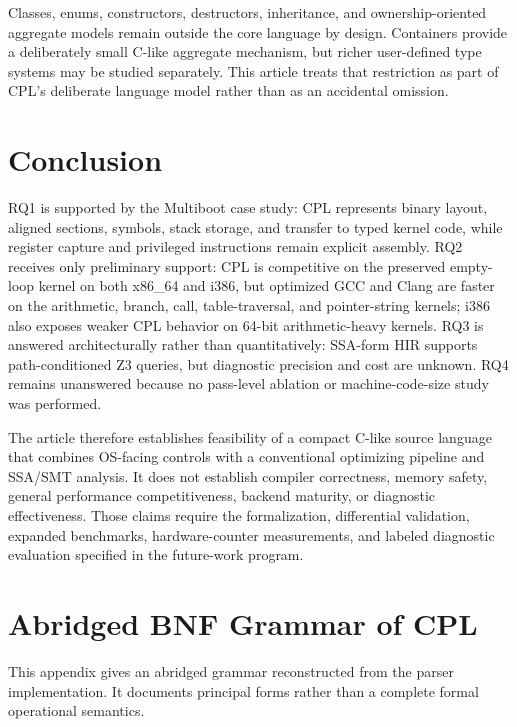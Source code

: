 \documentclass[10pt,twocolumn]{article}
\begin{document}
\par Classes, enums, constructors, destructors, inheritance, and ownership-oriented aggregate models remain outside the core language by design. Containers provide a deliberately small C-like aggregate mechanism, but richer user-defined type systems may be studied separately. This article treats that restriction as part of CPL's deliberate language model rather than as an accidental omission.

\section{Conclusion}

\par RQ1 is supported by the Multiboot case study: CPL represents binary layout, aligned sections, symbols, stack storage, and transfer to typed kernel code, while register capture and privileged instructions remain explicit assembly. RQ2 receives only preliminary support: CPL is competitive on the preserved empty-loop kernel on both x86\_64 and i386, but optimized GCC and Clang are faster on the arithmetic, branch, call, table-traversal, and pointer-string kernels; i386 also exposes weaker CPL behavior on 64-bit arithmetic-heavy kernels. RQ3 is answered architecturally rather than quantitatively: SSA-form HIR supports path-conditioned Z3 queries, but diagnostic precision and cost are unknown. RQ4 remains unanswered because no pass-level ablation or machine-code-size study was performed.

\par The article therefore establishes feasibility of a compact C-like source language that combines OS-facing controls with a conventional optimizing pipeline and SSA/SMT analysis. It does not establish compiler correctness, memory safety, general performance competitiveness, backend maturity, or diagnostic effectiveness. Those claims require the formalization, differential validation, expanded benchmarks, hardware-counter measurements, and labeled diagnostic evaluation specified in the future-work program.

\appendix

\section{Abridged BNF Grammar of CPL}
\label{app:cpl-bnf}

\par This appendix gives an abridged grammar reconstructed from the parser implementation. It documents principal forms rather than a complete formal operational semantics.
\end{document}
